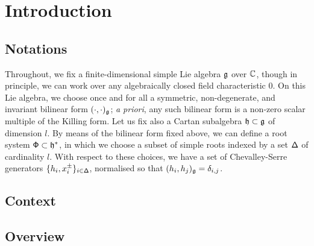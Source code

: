 \section{Introduction}
    \subsection{Notations}
        Throughout, we fix a finite-dimensional simple Lie algebra $\mathfrak{g}$ over $\mathbb{C}$, though in principle, we can work over any algebraically closed field characteristic $0$. On this Lie algebra, we choose once and for all a symmetric, non-degenerate, and invariant bilinear form $(\cdot, \cdot)_{\mathfrak{g}}$; \textit{a priori}, any such bilinear form is a non-zero scalar multiple of the Killing form. Let us fix also a Cartan subalgebra $\mathfrak{h} \subset \mathfrak{g}$ of dimension $l$. By means of the bilinear form fixed above, we can define a root system $\mathsf{\Phi} \subset \mathfrak{h}^*$, in which we choose a subset of simple roots indexed by a set $\mathsf{\Delta}$ of cardinality $l$. With respect to these choices, we have a set of Chevalley-Serre generators $\{h_i, x_i^{\pm}\}_{i \in \mathsf{\Delta}}$, normalised so that $(h_i, h_j)_{\mathfrak{g}} = \delta_{i, j}$. 

    \subsection{Context}

    \subsection{Overview}